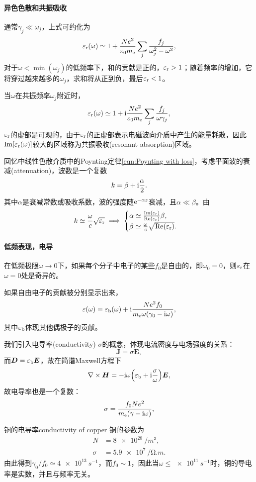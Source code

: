 \paragraph{异色色散和共振吸收}
通常$\gamma_j\ll\omega_j$，上式可约化为
\[
    \varepsilon_\text r(\omega)\simeq 1+\frac{Ne^2}{\varepsilon_0m_\mathrm e}\sum_j\frac{f_j}{\omega_j^2-\omega^2},
\]
对于$\omega<\min(\omega_j)$的低频率下，和的贡献是正的，$\varepsilon_\text r>1$；随着频率的增加，它将穿过越来越多的$\omega_j$，求和将从正到负，最后$\varepsilon_\text r<1$。

当$\omega$在共振频率$\omega_j$附近时，
\[
    \varepsilon_\text r(\omega)\simeq 1+\mathrm{i}\frac{Ne^2}{\varepsilon_0m_\mathrm e}\sum_j\frac{f_j}{\omega\gamma_j},
\]
$\varepsilon_\text r$的虚部是可观的，由于$\varepsilon_\text r$的正虚部表示电磁波向介质中产生的能量耗散，因此$\operatorname{Im}[\varepsilon_\text r(\omega)]$较大的区域称为共振吸收(resonant absorption)区域。

回忆中线性色散介质中的Poynting定律\eqref{eqn:Poynting with loss}，考虑平面波的衰减(attenuation)，波数是一个复数
\[
    k=\beta+\mathrm{i}\frac\alpha 2.
\]
其中$\alpha$是衰减常数或吸收系数，波的强度随$\mathop{}\!\mathrm{e}^{-\alpha z}$衰减，且$\alpha\ll\beta$。由
\[
    k\simeq\frac\omega c\sqrt{\varepsilon_\text r}\implies
    \begin{cases}
        \alpha\simeq\frac{\operatorname{Im}(\varepsilon_\text r)}{\operatorname{Re}(\varepsilon_\text r)}\beta,\\
        \beta\simeq\frac\omega c\sqrt{\operatorname{Re}(\varepsilon_\text r)}.
    \end{cases}
\]
\paragraph{低频表现，电导}
在低频极限$\omega\to0$下，如果每个分子中电子的某些$f_0$是自由的，即$\omega_0=0$，则$\varepsilon_\text r$在$\omega=0$处是奇异的。

如果自由电子的贡献被分别显示出来，
\[
    \varepsilon(\omega)=\varepsilon_\text b(\omega)+\mathrm{i}\frac{Ne^2f_0}{m_\mathrm e\omega(\gamma_0-\mathrm{i}\omega)},
\]
其中$\varepsilon_\text b$体现其他偶极子的贡献。

我们引入电导率(conductivity) $\sigma$的概念，体现电流密度与电场强度的关系：
\[
    \bm J=\sigma\bm E,
\]
而$\bm D=\varepsilon_\text b\bm E$，故在简谐Maxwell方程下
\[
    \nabla\times\bm H=-\mathrm{i}\omega\Bigl(\varepsilon_\text b+\mathrm{i}\frac\sigma\omega\Bigr)\bm E,
\]
故电导率也是一个复数：
\begin{equation}
    \sigma=\frac{f_0Ne^2}{m_\mathrm e(\gamma-\mathrm{i}\omega)},
\end{equation} 
\begin{example}{铜的电导率}{conductivity of copper}
    铜的参数为
    \begin{align*}
        N&=\SI{8e28}{/m^3},\\
        \sigma&=\SI{5.9e7}{/\ohm.m}.
    \end{align*}
    由此得到$\gamma_0/f_0\simeq\SI{4e13}{s^{-1}}$，而$f_0\sim 1$，因此当$\omega\leqslant\SI{e11}{s^{-1}}$时，铜的导电率是实数，并且与频率无关。
\end{example}
